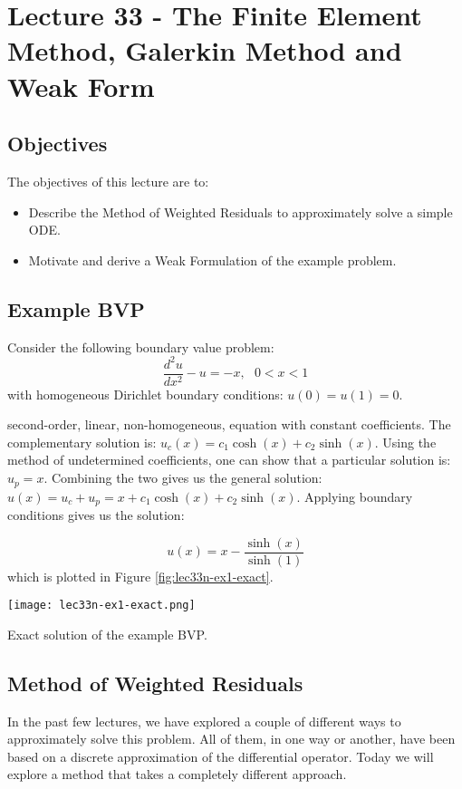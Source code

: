 \chapter{Lecture 33 - The Finite Element Method, Galerkin Method and Weak Form}
\label{ch:lec33n}
\section{Objectives}
The objectives of this lecture are to:
\begin{itemize}
\item Describe the Method of Weighted Residuals to approximately solve a simple ODE.
\item Motivate and derive a Weak Formulation of the example problem.
\end{itemize}
\setcounter{lstannotation}{0}

\section{Example BVP}
Consider the following boundary value problem:
\begin{equation*}
\frac{d^2u}{dx^2}-u = -x, \ \ \ 0 < x < 1 
\end{equation*}
with homogeneous Dirichlet boundary conditions: $u(0)=u(1) = 0$.

 second-order, linear, non-homogeneous, equation with constant coefficients.  The complementary solution is: $u_c(x) = c_1\cosh{(x)}+c_2\sinh{(x)}$.  Using the method of undetermined coefficients, one can show that a particular solution is: $u_p = x$.  Combining the two gives us the general solution: $u(x) = u_c + u_p = x + c_1\cosh{(x)}+c_2\sinh{(x)}$. Applying boundary conditions gives us the solution:

\begin{equation}
u(x) = x - \frac{\sinh{(x)}}{\sinh{(1)}}
\label{eq:lec33n-ex-analytic}
\end{equation}
which is plotted in Figure \ref{fig:lec33n-ex1-exact}.
\begin{marginfigure}
\texttt{[image: lec33n-ex1-exact.png]}
\caption{Exact solution of the example BVP.}
\label{fig:lec33n-ex1-exact}
\end{marginfigure}

\section{Method of Weighted Residuals}
In the past few lectures, we have explored a couple of different ways to approximately solve this problem.  All of them, in one way or another, have been based on a discrete approximation of the differential operator.  Today we will explore a method that takes a completely different approach.

